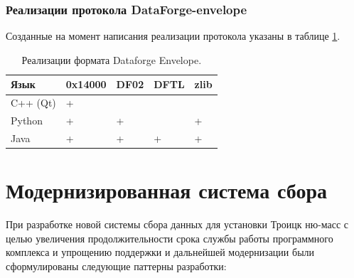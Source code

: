 \documentclass[a4paper,14pt]{extreport}
\begin{document}
\subsubsection{Реализации протокола DataForge-envelope}
Созданные на момент написания реализации протокола указаны в таблице \ref{tab:dataforge-implementations}.

\begin{table}
    \centering
    \begin{tabular}{|l|l|l|l|l|}
    \hline
    Язык & 0x14000 & DF02 & DFTL & zlib \\
    \hline
    C++ (Qt) & + & & & \\
    \hline
    Python & + & + & & + \\
    \hline
    Java & + & + & + & + \\
    \hline
    \end{tabular} 
    \caption{Реализации формата Dataforge Envelope.}
    \label{tab:dataforge-implementations}
\end{table}


\section{Модернизированная система сбора}

При разработке новой системы сбора данных для установки Троицк ню-масс с целью увеличения продолжительности срока службы работы программного комплекса и упрощению поддержки и дальнейшей модернизации были сформулированы следующие паттерны разработки:
\end{document}
